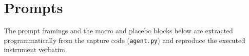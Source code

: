 \documentclass[a4paper,fleqn]{cas-sc}
\begin{document}
\section{Prompts}\label{app:prompts}
The prompt framings and the macro and placebo blocks below are extracted programmatically from the
capture code (\texttt{agent.py}) and reproduce the executed instrument verbatim.


\printcredits



\end{document}
